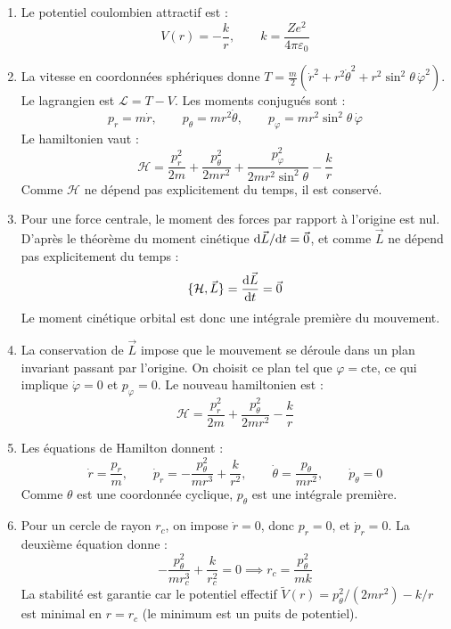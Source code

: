 \documentclass[12pt,a4paper]{article}
\begin{document}
\begin{boitecorrige}
\begin{enumerate}
  \item Le potentiel coulombien attractif est :
  \[
    V(r) = -\frac{k}{r}, \qquad k = \frac{Ze^2}{4\pi\varepsilon_0}
  \]

  \item La vitesse en coordonnées sphériques donne $T = \frac{m}{2}(\dot r^2 + r^2\dot\theta^2 + r^2\sin^2\!\theta\,\dot\varphi^2)$. Le lagrangien est $\mathcal{L} = T - V$. Les moments conjugués sont :
  \[
    p_r = m\dot r, \qquad p_\theta = mr^2\dot\theta, \qquad p_\varphi = mr^2\sin^2\!\theta\,\dot\varphi
  \]
  Le hamiltonien vaut :
  \[
    \mathcal{H} = \frac{p_r^2}{2m} + \frac{p_\theta^2}{2mr^2} + \frac{p_\varphi^2}{2mr^2\sin^2\!\theta} - \frac{k}{r}
  \]
  Comme $\mathcal{H}$ ne dépend pas explicitement du temps, il est conservé.

  \item Pour une force centrale, le moment des forces par rapport à l'origine est nul. D'après le théorème du moment cinétique $\mathrm{d}\vec{L}/\mathrm{d} t = \vec{0}$, et comme $\vec{L}$ ne dépend pas explicitement du temps :
  \[
    \{\mathcal{H}, \vec{L}\} = \frac{\mathrm{d}\vec{L}}{\mathrm{d} t} = \vec{0}
  \]
  Le moment cinétique orbital est donc une intégrale première du mouvement.

  \item La conservation de $\vec{L}$ impose que le mouvement se déroule dans un plan invariant passant par l'origine. On choisit ce plan tel que $\varphi = \mathrm{cte}$, ce qui implique $\dot\varphi = 0$ et $p_\varphi = 0$. Le nouveau hamiltonien est :
  \[
    \mathcal{H} = \frac{p_r^2}{2m} + \frac{p_\theta^2}{2mr^2} - \frac{k}{r}
  \]

  \item Les équations de Hamilton donnent :
  \[
    \dot r = \frac{p_r}{m}, \qquad
    \dot p_r = -\frac{p_\theta^2}{mr^3} + \frac{k}{r^2}, \qquad
    \dot\theta = \frac{p_\theta}{mr^2}, \qquad
    \dot p_\theta = 0
  \]
  Comme $\theta$ est une coordonnée cyclique, $p_\theta$ est une intégrale première.

  \item Pour un cercle de rayon $r_c$, on impose $\dot r = 0$, donc $p_r = 0$, et $\dot p_r = 0$. La deuxième équation donne :
  \[
    -\frac{p_\theta^2}{mr_c^3} + \frac{k}{r_c^2} = 0 \implies \boxed{r_c = \frac{p_\theta^2}{mk}}
  \]
  La stabilité est garantie car le potentiel effectif $\tilde V(r) = p_\theta^2/(2mr^2) - k/r$ est minimal en $r = r_c$ (le minimum est un puits de potentiel).
\end{enumerate}
\end{boitecorrige}
\end{document}
